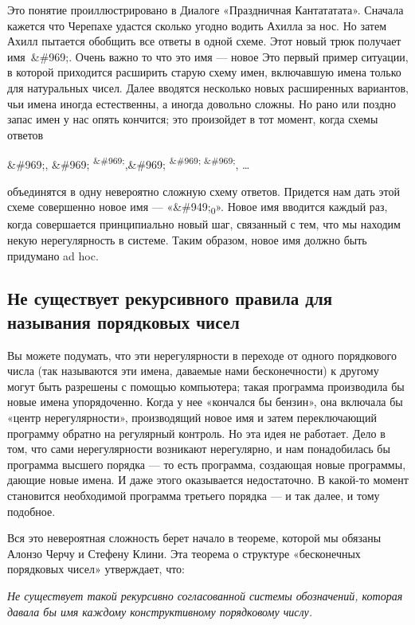 \documentclass[../main.tex]{subfiles}
\begin{document}
Это понятие проиллюстрировано в Диалоге «Праздничная Кантататата». Сначала кажется что Черепахе удастся сколько угодно водить Ахилла за нос. Но затем Ахилл пытается обобщить все ответы в одной схеме. Этот новый трюк получает имя~\&\#969;. Очень важно то что это имя --- новое Это первый пример ситуации, в которой приходится расширить старую схему имен, включавшую имена только для натуральных чисел. Далее вводятся несколько новых расширенных вариантов, чьи имена иногда естественны, а иногда довольно сложны. Но рано или поздно запас имен у нас опять кончится; это произойдет в тот момент, когда схемы ответов

\&\#969;, \&\#969; \textsuperscript{\&\#969;},\&\#969; \textsuperscript{\&\#969; \&\#969;}, \ldots{}

объединятся в одну невероятно сложную схему ответов. Придется нам дать этой схеме совершенно новое имя --- «\&\#949;\textsubscript{0}». Новое имя вводится каждый раз, когда совершается принципиально новый шаг, связанный с тем, что мы находим некую нерегулярность в системе. Таким образом, новое имя должно быть придумано ad hoc.


\subsection{Не существует рекурсивного правила для называния порядковых чисел}

Вы можете подумать, что эти нерегулярности в переходе от одного порядкового числа (так называются эти имена, даваемые нами бесконечности) к другому могут быть разрешены с помощью компьютера; такая программа производила бы новые имена упорядоченно. Когда у нее «кончался бы бензин», она включала бы «центр нерегулярности», производящий новое имя и затем переключающий программу обратно на регулярный контроль. Но эта идея не работает. Дело в том, что сами нерегулярности возникают нерегулярно, и нам понадобилась бы программа высшего порядка --- то есть программа, создающая новые программы, дающие новые имена. И даже этого оказывается недостаточно. В какой-то момент становится необходимой программа третьего порядка --- и так далее, и тому подобное.

Вся это невероятная сложность берет начало в теореме, которой мы обязаны Алонзо Черчу и Стефену Клини. Эта теорема о структуре «бесконечных порядковых чисел» утверждает, что:

\emph{Не существует такой рекурсивно согласованной системы обозначений, которая давала бы имя каждому конструктивному порядковому числу.}
\end{document}
